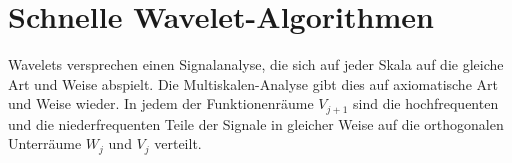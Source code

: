 %
%
%
\chapter{Schnelle Wavelet-Algorithmen
\label{chapter:algo}}
Wavelets versprechen einen Signalanalyse, die sich auf jeder Skala auf
die gleiche Art und Weise abspielt.
Die Multiskalen-Analyse gibt dies auf axiomatische Art und Weise wieder.
In jedem der Funktionenräume $V_{j+1}$ sind die hochfrequenten und die 
niederfrequenten Teile der Signale in gleicher Weise auf die 
orthogonalen Unterräume $W_j$ und $V_j$ verteilt.










